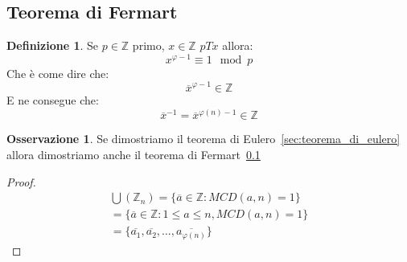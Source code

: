 \documentclass{article}
\theoremstyle{definition}
\newtheorem{definition}{Definizione}[section]
\newtheorem{oss}{Osservazione}[section]
\begin{document}
\subsection{Teorema di Fermart}\label{sec:teorema_di_fermart}
\begin{definition}
        Se $p \in \mathbb{Z}$ primo, $ x \in \mathbb{Z} $ $ p T x  $ allora:
        \begin{equation*}
                x^{\varphi-1} \equiv 1 \mod p
        \end{equation*}
        Che è come dire che:
        \begin{equation*}
                \overline{x}^{\varphi - 1} \in \mathbb{Z}
        \end{equation*}
        E ne consegue che:
        \begin{equation*}
                \overline{x}^{-1} = \overline{x}^{\varphi(n) - 1} \in \mathbb{Z}
        \end{equation*}
\end{definition}

\begin{oss}
        Se dimostriamo il teorema di Eulero~\ref{sec:teorema_di_eulero} allora dimostriamo anche il teorema di Fermart~\ref{sec:teorema_di_fermart}
\end{oss}

\begin{proof}
        \begin{align*}
                \bigcup(\mathbb{Z}_n) = \{\overline{a} \in \mathbb{Z} : MCD(a,n) = 1\} \\
                = \{\overline{a} \in \mathbb{Z} : 1 \le a \le n, MCD(a,n) = 1\} \\
                = \{\overline{a_1}, \overline{a_2},\ldots,\overline{a_{\varphi(n)}}\}
        \end{align*} 
\end{proof}
\end{document}
